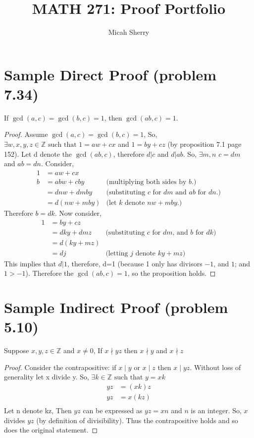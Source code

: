 \documentclass{article}
\title{MATH 271: Proof Portfolio}
\author{Micah Sherry}
\newcommand{\Z}{\mathbb{Z}}
\newcommand{\st}{\text{ such that }}
\begin{document}
	\maketitle
	\section*{Sample Direct Proof (problem 7.34)}
	If $\gcd(a,c)= \gcd(b,c)=1$, then $\gcd(ab,c)=1$.
	\begin{proof}
		Assume $\gcd(a,c)= \gcd(b,c)=1$, So, $\exists w, x, y, z  \in \Z \st 1= aw+ cx$ and $1= by + cz$ (by proposition 7.1 page 152).
		Let d denote the $\gcd(ab,c)$, therefore $d|c$ and $d| ab$. So, $\exists m,n$ \st $c=dm$ and $ab =dn$. 
		Consider, 
		\begin{align*}
			1 &= aw+cx\\
			b &= abw+cby 	& \text{(multiplying both sides by $b$.)}\\
			&= dnw+dmby 	& \text{(substituting $c$ for $dm$ and $ab$ for $dn$.)}\\
			&= d(nw+mby) 	& \text{(let $k$ denote $nw+mby$.)}
		\end{align*}
		Therefore $b = dk$. Now consider,
		\begin{align*}
			1 &= by + cz \\
			&= dky+ dmz & \text{(substituting $c$ for $dm$, and $b$ for $dk$)}\\
			&= d(ky+mz) \\				  
			&= dj 	  & \text{(letting $j$ denote $ky+mz$)}
		\end{align*}
		This implies that $d|1$, therefore, d=1 (because 1 only has divisors $-1$, and $1$; and $1 > -1$). Therefore the $\gcd(ab,c)=1$, so the proposition holds.
	\end{proof}
	
	\section*{Sample Indirect Proof (problem 5.10)}
	Suppose $x, y, z \in \Z$ and $ x \neq 0$, If $x \nmid yz $ then $ x \nmid y $ and $ x \nmid z $ 
	\begin{proof}
		Consider the contrapositive: if $x \mid y$  or  $x \mid z$ then  $x \mid yz $. Without loss of generality let x divide y. 
		So, $ \exists k \in \Z \st y = xk $ 
		\begin{align*}
		yz &= (xk)z\\
		yz &= x(kz)\\
		\end{align*}
		Let n denote kz, Then $yz$ can be expressed as $yz = xn$ and $n$ is an integer. So, $x$ divides $yz$ (by definition of divisibility). Thus the contrapositive holds and so does the original statement.
		
	\end{proof}
	\pagebreak
\end{document}
